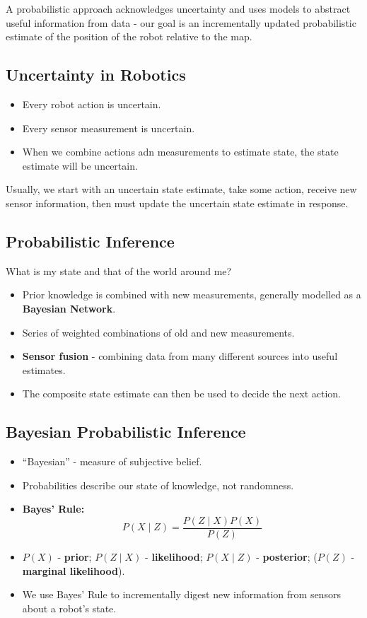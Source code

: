 \documentclass[11pt]{article}
\begin{document}
A probabilistic approach acknowledges uncertainty and uses models to abstract useful information from data - our goal is an incrementally updated probabilistic estimate of the position of the robot relative to the map.

\subsection{Uncertainty in Robotics}
\begin{itemize}
  \item Every robot action is uncertain.
  \item Every sensor measurement is uncertain.
  \item When we combine actions adn measurements to estimate state, the state estimate will be uncertain.
\end{itemize}

Usually, we start with an uncertain state estimate, take some action, receive new sensor information, then must update the uncertain state estimate in response.

\subsection{Probabilistic Inference}
What is my state and that of the world around me?
\begin{itemize}
  \item Prior knowledge is combined with new measurements, generally modelled as a \textbf{Bayesian Network}.
  \item Series of weighted combinations of old and new measurements.
  \item \textbf{Sensor fusion} - combining data from many different sources into useful estimates.
  \item The composite state estimate can then be used to decide the next action.
\end{itemize}

\subsection{Bayesian Probabilistic Inference}
\begin{itemize}
  \item ``Bayesian'' - measure of subjective belief.
  \item Probabilities describe our state of knowledge, not randomness.
  \item \textbf{Bayes' Rule:}
    \[
      P(X \mid Z) = \frac{P(Z \mid X)P(X)}{P(Z)}
    \]
  \item $P(X)$ - \textbf{prior}; $P(Z \mid X)$ - \textbf{likelihood}; $P(X \mid Z)$ - \textbf{posterior}; ($P(Z)$ - \textbf{marginal likelihood}).
  \item We use Bayes' Rule to incrementally digest new information from sensors about a robot's state.
\end{itemize}
\end{document}
